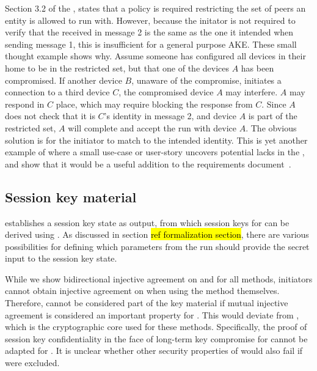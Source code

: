 \documentclass[runningheads,draft]{llncs}
\begin{document}
Section 3.2 of the \mSpec, states that a policy is required restricting the set
of peers an entity is allowed to run \mEdhoc{} with.
%
However, because the initator is not required to verify that the \mIdcredr{}
received in message 2 is the same as the one it intended when sending message 1,
this is insufficient for a general purpose AKE.
%
These small thought example shows why.
%
Assume someone has configured all devices in their home to be in the restricted
set, but that one of the devices $A$ has been compromised.
%
If another device $B$, unaware of the compromise, initiates a connection to a
third device $C$, the compromised device $A$ may interfere.
%
$A$ may respond in $C$ place, which may require blocking the response from $C$.
%
Since $A$ does not check that it is $C$'s identity in message 2, and device $A$
is part of the restricted set, $A$ will complete and accept the \mEdhoc{} run with
device $A$.
%
The obvious solution is for the initiator to match \mIdcredr{} to the intended
identity.
%
This is yet another example of where a small use-case or user-story uncovers
potential lacks in the \mSpec, and show that it would be a useful addition to
the requirements document~\cite{ietf-lake-reqs-04}.
%

\subsection{Session key material}
\label{sec:sessionKeyMaterial}
\mEdhoc{} establishes a session key state as output, from which session keys for
\mOscore{} can be derived using \mHkdf{}.
%
As discussed in section \hl{ref formalization section}, there are various
possibilities for defining which parameters from the \mEdhoc{} run should
provide the secret input to the session key state.

While we show bidirectional injective agreement on \mGx{} and \mGy{}
for all methods, initiators cannot obtain injective agreement on \mGiy{} when
using the \mStat{} method themselves.
%
Therefore, \mGiy{} cannot be considered part of the key material if mutual
injective agreement is considered an important property for \mEdhoc{}.
%
This would deviate from \mOptls{}, which is the cryptographic core used for
these methods.
%
Specifically, the proof of session key confidentiality in the face of long-term
key compromise for \mOptls{} cannot be adapted for \mEdhoc{}.
%
It is unclear whether other security properties of \mOptls{} would also fail if
\mGiy{} were excluded.
%
\end{document}
